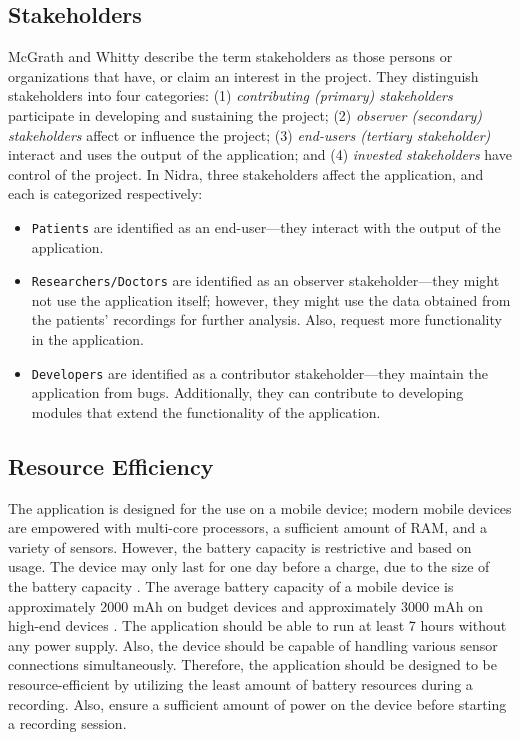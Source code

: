 \subsection{Stakeholders}
McGrath and Whitty \cite{stakeholderdefined} describe the term stakeholders as those persons or organizations that have, or claim an interest in the project. They distinguish stakeholders into four categories: (1) \textit{contributing (primary) stakeholders} participate in developing and sustaining the project; (2) \textit{observer (secondary) stakeholders} affect or influence the project;  (3) \textit{end-users (tertiary stakeholder)} interact and uses the output of the application; and (4) \textit{invested stakeholders} have control of the project. In Nidra, three stakeholders affect the application, and each is categorized respectively:
\begin{itemize}
    \item \verb|Patients| are identified as an end-user---they interact with the output of the application.  
    \item \verb|Researchers/Doctors| are identified as an observer stakeholder---they might not use the application itself; however, they might use the data obtained from the patients' recordings for further analysis. Also, request more functionality in the application.
    \item \verb|Developers| are identified as a contributor stakeholder---they maintain the application from bugs. Additionally, they can contribute to developing modules that extend the functionality of the application. 
\end{itemize}

\subsection{Resource Efficiency}
The application is designed for the use on a mobile device; modern mobile devices are empowered with multi-core processors, a sufficient amount of RAM, and a variety of sensors. However, the battery capacity is restrictive and based on usage. The device may only last for one day before a charge, due to the size of the battery capacity \cite{androidbattery}. The average battery capacity of a mobile device is approximately 2000 mAh on budget devices and approximately 3000 mAh on high-end devices \cite{androidbatteryavg}. The application should be able to run at least 7 hours without any power supply. Also, the device should be capable of handling various sensor connections simultaneously. Therefore, the application should be designed to be resource-efficient by utilizing the least amount of battery resources during a recording. Also, ensure a sufficient amount of power on the device before starting a recording session.  

